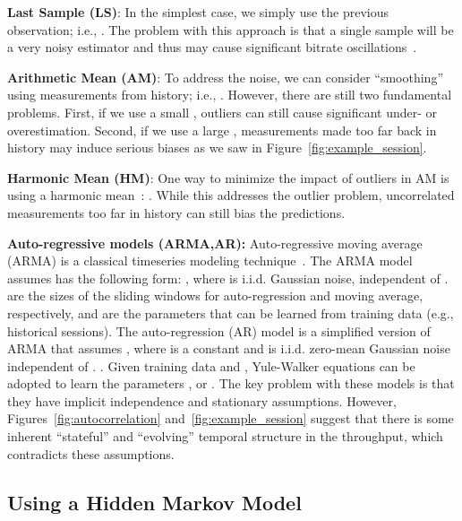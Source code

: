 \begin{packeditemize}

\item \textbf{{Last Sample} (LS)}: In the simplest case, we simply use the previous
observation; i.e., . The
problem with this approach is that a single sample will be a very noisy
estimator and thus may cause significant bitrate oscillations~\cite{yin2015controlvideo,jiang2014improving}.

\item \textbf{Arithmetic Mean (AM)}: To address the noise, we can consider
``smoothing'' using   measurements from  history; i.e.,   .  However, there are
still two fundamental problems.  First, if we use a small ,  outliers can
still cause significant under- or overestimation. Second, if we use a large
,  measurements made too far back in history may induce serious biases as we saw in
Figure~\ref{fig:example_session}.

\item \textbf{Harmonic Mean (HM)}: One way to minimize the impact of outliers
in AM is using a harmonic mean~\cite{jiang2014improving}: . While this
addresses the outlier problem, uncorrelated  measurements
too far in  history can still bias the predictions.

\item \textbf{Auto-regressive models (ARMA,AR):} Auto-regressive moving average
(ARMA)  is a classical timeseries modeling technique~\cite{tcppredictability}.
The ARMA model assumes   has the following form: , where  is i.i.d. Gaussian noise,  independent of .   are the
sizes of the sliding windows for auto-regression and moving average,
respectively, and  are
the parameters that can be learned from training data (e.g., historical
sessions).  The auto-regression (AR) model is  a simplified version of ARMA
that  assumes  , where  is a
constant and  is 
i.i.d. zero-mean Gaussian noise independent of .
.  Given training data and
, Yule-Walker equations can be adopted to learn the parameters
, or .  The key problem with these models is that
they have implicit independence and stationary assumptions.   However,
Figures~\ref{fig:autocorrelation} and~\ref{fig:example_session} suggest that
there is some inherent ``stateful'' and ``evolving'' temporal structure in the
throughput, which contradicts these assumptions.


\end{packeditemize}


\subsection{Using a Hidden Markov Model}
\label{sec:premodel:hmm}

